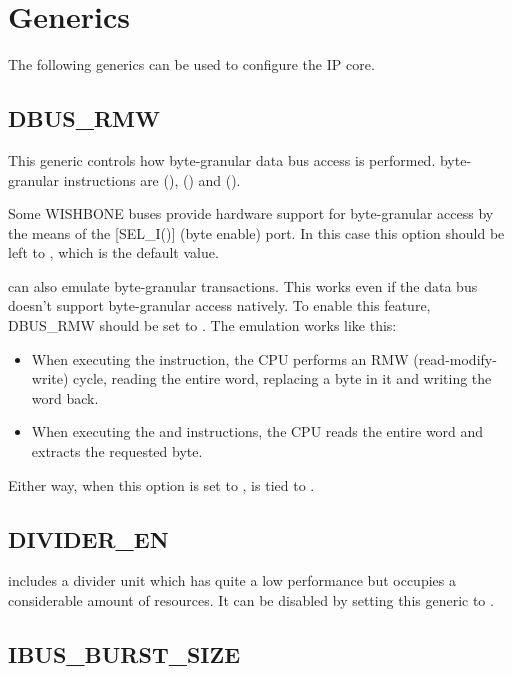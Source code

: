 \documentclass[a4paper,12pt,twoside,extrafontsizes]{memoir}
\begin{document}
\section{Generics}
\label{sec:generics}

The following generics can be used to configure the \lxp{} IP core.

\subsection{DBUS\_RMW}

This  generic controls how byte-granular data bus access is performed. \lxp{} byte-granular instructions are  (),  () and  ().

Some WISHBONE buses provide hardware support for byte-granular access by the means of the [SEL\_I()] (byte enable) port. In this case this option should be left to , which is the default value.

\lxp{} can also emulate byte-granular transactions. This works even if the data bus doesn't support byte-granular access natively. To enable this feature, DBUS\_RMW should be set to . The emulation works like this:

\begin{itemize}
\item When executing the  instruction, the CPU performs an RMW (read-modify-write) cycle, reading the entire word, replacing a byte in it and writing the word back.
\item When executing the  and  instructions, the CPU reads the entire word and extracts the requested byte.
\end{itemize}

Either way, when this option is set to ,  is tied to .

\subsection{DIVIDER\_EN}

\lxp{} includes a divider unit which has quite a low performance but occupies a considerable amount of resources. It can be disabled by setting this  generic to .

\subsection{IBUS\_BURST\_SIZE}
\end{document}
